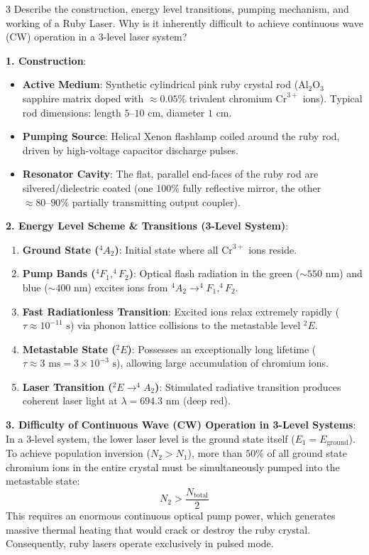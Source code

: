 \begin{theoryq}{3}
Describe the construction, energy level transitions, pumping mechanism, and working of a Ruby Laser. Why is it inherently difficult to achieve continuous wave (CW) operation in a 3-level laser system?
\end{theoryq}
\begin{theorysol}
\textbf{1. Construction}:
\begin{itemize}
    \item \textbf{Active Medium}: Synthetic cylindrical pink ruby crystal rod ($\text{Al}_2\text{O}_3$ sapphire matrix doped with $\approx 0.05\%$ trivalent chromium $\text{Cr}^{3+}$ ions). Typical rod dimensions: length $5\text{--}10\text{ cm}$, diameter $1\text{ cm}$.
    \item \textbf{Pumping Source}: Helical Xenon flashlamp coiled around the ruby rod, driven by high-voltage capacitor discharge pulses.
    \item \textbf{Resonator Cavity}: The flat, parallel end-faces of the ruby rod are silvered/dielectric coated (one $100\%$ fully reflective mirror, the other $\approx 80\text{--}90\%$ partially transmitting output coupler).
\end{itemize}

\textbf{2. Energy Level Scheme \& Transitions (3-Level System)}:
\begin{enumerate}
    \item \textbf{Ground State ($^4A_2$)}: Initial state where all $\text{Cr}^{3+}$ ions reside.
    \item \textbf{Pump Bands ($^4F_1, ^4F_2$)}: Optical flash radiation in the green ($\sim 550\text{ nm}$) and blue ($\sim 400\text{ nm}$) excites ions from $^4A_2 \to ^4F_1, ^4F_2$.
    \item \textbf{Fast Radiationless Transition}: Excited ions relax extremely rapidly ($\tau \approx 10^{-11}\text{ s}$) via phonon lattice collisions to the metastable level $^2E$.
    \item \textbf{Metastable State ($^2E$)}: Possesses an exceptionally long lifetime ($\tau \approx 3\text{ ms} = 3 \times 10^{-3}\text{ s}$), allowing large accumulation of chromium ions.
    \item \textbf{Laser Transition ($^2E \to ^4A_2$)}: Stimulated radiative transition produces coherent laser light at \textbf{$\lambda = 694.3\text{ nm}$} (deep red).
\end{enumerate}

\textbf{3. Difficulty of Continuous Wave (CW) Operation in 3-Level Systems}:
In a 3-level system, the lower laser level is the ground state itself ($E_1 = E_{\text{ground}}$).
To achieve population inversion ($N_2 > N_1$), more than $50\%$ of all ground state chromium ions in the entire crystal must be simultaneously pumped into the metastable state:
\begin{equation}
N_2 > \frac{N_{\text{total}}}{2}
\end{equation}
This requires an enormous continuous optical pump power, which generates massive thermal heating that would crack or destroy the ruby crystal. Consequently, ruby lasers operate exclusively in pulsed mode.
\end{theorysol}
